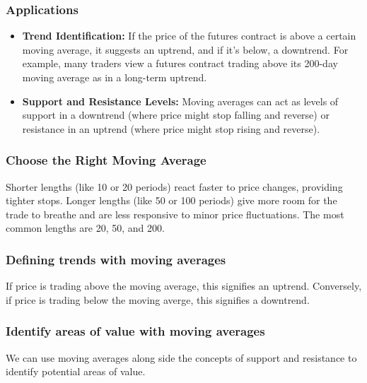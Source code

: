 \documentclass{report}
\begin{document}
     \subsubsection{Applications}
     \begin{itemize}
         \item \textbf{Trend Identification:} If the price of the futures contract is above a certain moving average, it suggests an uptrend, and if it's below, a downtrend. For example, many traders view a futures contract trading above its 200-day moving average as in a long-term uptrend.
         \item \textbf{Support and Resistance Levels:} Moving averages can act as levels of support in a downtrend (where price might stop falling and reverse) or resistance in an uptrend (where price might stop rising and reverse).
     \end{itemize}
     \bigbreak \noindent 

     \bigbreak \noindent 
     \subsubsection{Choose the Right Moving Average}
     \bigbreak \noindent 
      Shorter lengths (like 10 or 20 periods) react faster to price changes, providing tighter stops. Longer lengths (like 50 or 100 periods) give more room for the trade to breathe and are less responsive to minor price fluctuations.
      \bigbreak \noindent 
      The most common lengths are 20, 50, and 200.

     \bigbreak \noindent 
     \subsubsection{Defining trends with moving averages}
     \bigbreak \noindent 
     \begin{concept}
        If price is trading above the moving average, this signifies an uptrend. Conversely, if price is trading below the moving averge, this signifies a downtrend. 
     \end{concept}
     \bigbreak \noindent 
     \subsubsection{Identify areas of value with moving averages}
     \bigbreak \noindent 
     We can use moving averages along side the concepts of support and resistance to identify potential areas of value.
     \bigbreak \noindent 
     \bigbreak \noindent 
     \bigbreak \noindent 
\end{document}
